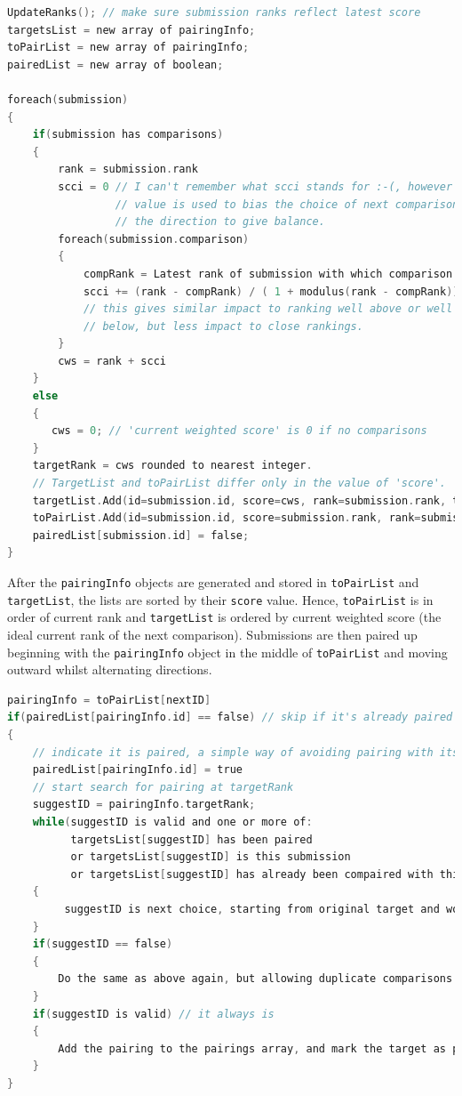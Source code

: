\documentclass{l4proj}
\begin{document}
\begin{lstlisting}[language=C, caption={Pseudocode for creating the pairing information by \cite{nbarr:pseudocode}}, captionpos=b]
UpdateRanks(); // make sure submission ranks reflect latest score
targetsList = new array of pairingInfo;
toPairList = new array of pairingInfo;
pairedList = new array of boolean;

foreach(submission)
{
    if(submission has comparisons)
    {
        rank = submission.rank 
        scci = 0 // I can't remember what scci stands for :-(, however this
                 // value is used to bias the choice of next comparison in 
                 // the direction to give balance.
        foreach(submission.comparison)
        {
            compRank = Latest rank of submission with which comparison was done.
            scci += (rank - compRank) / ( 1 + modulus(rank - compRank))
            // this gives similar impact to ranking well above or well 
            // below, but less impact to close rankings.
        }
        cws = rank + scci
    }
    else
    {
       cws = 0; // 'current weighted score' is 0 if no comparisons
    }
    targetRank = cws rounded to nearest integer.
    // TargetList and toPairList differ only in the value of 'score'. 
    targetList.Add(id=submission.id, score=cws, rank=submission.rank, targetRank=targetRank, paired=false);
    toPairList.Add(id=submission.id, score=submission.rank, rank=submission.rank, targetRank=targetRank, paired=false);
    pairedList[submission.id] = false;
}
\end{lstlisting}

After the \lstinline{pairingInfo} objects are generated and stored in \lstinline{toPairList} and \lstinline{targetList}, the lists are sorted by their \lstinline{score} value. Hence, \lstinline{toPairList} is in order of current rank and \lstinline{targetList} is ordered by current weighted score (the ideal current rank of the next comparison). Submissions are then paired up beginning with the \lstinline{pairingInfo} object in the middle of \lstinline{toPairList} and moving outward whilst alternating directions.

\begin{lstlisting}[language=C, caption={Pseudocode for pairing a submission by \cite{nbarr:pseudocode}}, captionpos=b]
pairingInfo = toPairList[nextID]
if(pairedList[pairingInfo.id] == false) // skip if it's already paired
{
    // indicate it is paired, a simple way of avoiding pairing with itself.
    pairedList[pairingInfo.id] = true
    // start search for pairing at targetRank
    suggestID = pairingInfo.targetRank;
    while(suggestID is valid and one or more of:
          targetsList[suggestID] has been paired
          or targetsList[suggestID] is this submission
          or targetsList[suggestID] has already been compaired with this submission)
    {
         suggestID is next choice, starting from original target and working outwards.
    }
    if(suggestID == false)
    {
        Do the same as above again, but allowing duplicate comparisons.
    }
    if(suggestID is valid) // it always is
    {
        Add the pairing to the pairings array, and mark the target as paired in pairedList
    }
}
\end{lstlisting}
\end{document}
